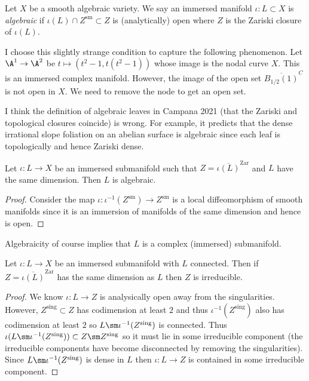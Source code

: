 \documentclass[12pt]{article}
\begin{document}
\begin{defn}
Let $X$ be a smooth algebraic variety. 
We say an immersed manifold $\iota : L \subset X$ is \textit{algebraic} if $\iota(L) \cap Z^{\text{sm}} \subset Z$ is (analytically) open where $Z$ is the Zariski closure of $\iota(L)$.
\end{defn}

\begin{rmk}
I choose this slightly strange condition to capture the following phenomenon. Let $\A^1 \to \A^2$ be $t \mapsto (t^2 - 1, t(t^2 - 1))$ whose image is the nodal curve $X$. This is an immersed complex manifold. However, the image of the open set $\overline{B_{1/2}(1)}^C$ is not open in $X$. We need to remove the node to get an open set.
\end{rmk}

\begin{rmk}
I think the definition of algebraic leaves in Campana 2021 (that the Zariski and topological closures coincide) is wrong. For example, it predicts that the dense irrational slope foliation on an abelian surface is algebraic since each leaf is topologically and hence Zariski dense. 
\end{rmk}

\begin{lemma}
Let $\iota : L \to X$ be an immersed submanifold such that $Z = \overline{\iota(L)}^{\text{Zar}}$ and $L$ have the same dimension. Then $L$ is algebraic.
\end{lemma}

\begin{proof}
Consider the map $\iota : \iota^{-1}(Z^{\text{sm}}) \to Z^{\text{sm}}$ is a local diffeomorphism of smooth manifolds since it is an immersion of manifolds of the same dimension and hence is open. 
\end{proof}

\begin{rmk}
Algebraicity of course implies that $L$ is a complex (immersed) submanifold.
\end{rmk}

\begin{lemma}
Let $\iota : L \to X$ be an immersed submanifold with $L$ connected. Then if $Z = \overline{\iota(L)}^{\text{Zar}}$ has the same dimension as $L$ then $Z$ is irreducible. 
\end{lemma}

\begin{proof}
We know $\iota : L \to Z$ is analysically open away from the singularities. However, $Z^{\text{sing}} \subset Z$ has codimension at least $2$ and thus $\iota^{-1}(Z^{\text{sing}})$ also has codimension at least $2$ so $L \sm \iota^{-1}(Z^{\text{sing}})$ is connected. Thus $\iota(L \sm \iota^{-1}(Z^\text{sing})) \subset Z \sm Z^{\text{sing}}$ so it must lie in some irreducible component (the irreducible components have become disconnected by removing the singularities). Since $L \sm \iota^{-1}(Z^{\text{sing}})$ is dense in $L$ then $\iota : L \to Z$ is contained in some irreducible component.  
\end{proof}
\end{document}
